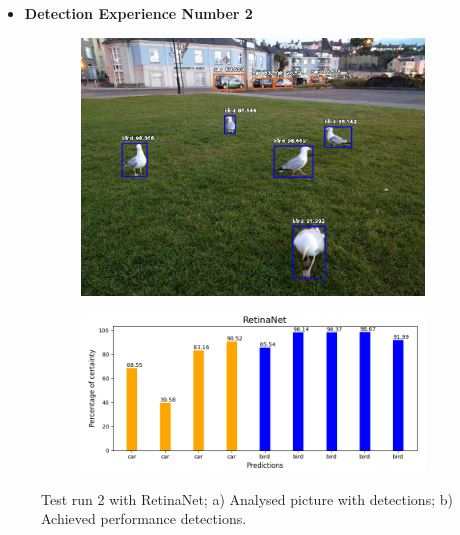      \newpage

      
  \begin{itemize}
    \item \textbf{Detection Experience Number 2}
  \end{itemize}

    

      \begin{figure}[H]
        \centering
        \captionsetup{justification=centering}

        \begin{subfigure}{0.29\textwidth}
        \includegraphics[width=\textwidth]{Sections/4InitialWork/4_images_obj_run3/retinaNet.jpg} 
        \caption{}
        \end{subfigure}
        \begin{subfigure}{0.65\textwidth}
        \includegraphics[width=\textwidth]{Sections/4InitialWork/4_images_obj_run3/retinaNet_graph.png}
        \caption{}
        \end{subfigure}
        
        \caption{ 
        Test run 2 with RetinaNet; a) Analysed picture with detections; b) Achieved performance detections. }
        \end{figure}



